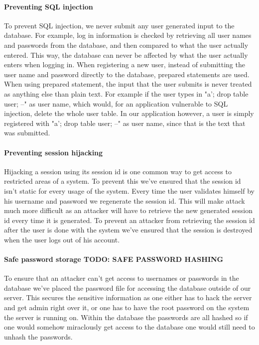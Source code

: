 \documentclass[11pt, a4paper]{article}
\begin{document}
\paragraph{Preventing SQL injection}
To prevent SQL injection, we never submit any user generated input to the database. For example, log in information is checked by retrieving all user names and passwords from the database, and then compared to what the user actually entered. This way, the database can never be affected by what the user actually enters when logging in.
When registering a new user, instead of submitting the user name and password directly to the database, prepared statements are used. When using prepared statement, the input that the user submits is never treated as anything else than plain text. For example if the user types in "a'; drop table user; --" as user name, which would, for an application vulnerable to SQL injection, delete the whole user table. In our application however, a user is simply registered with "a'; drop table user; --" as user name, since that is the text that was submitted.
\paragraph{Preventing session hijacking}
Hijacking a session using its session id is one common way to get access to restricted areas of a system. To prevent this we've ensured that the session id isn't static for every usage of the system. Every time the user validates himself by his username and password we regenerate the session id. This will make attack much more difficult as an attacker will have to retrieve the new generated session id every time it is generated. To prevent an attacker from retrieving the session id after the user is done with the system we've ensured that the session is destroyed when the user logs out of his account. 
\paragraph{Safe password storage TODO: SAFE PASSWORD HASHING}
To ensure that an attacker can't get access to usernames or passwords in the database we've placed the password file for accessing the database outside of our server. This secures the sensitive information as one either has to hack the server and get admin right over it, or one has to have the root password on the system the server is running on. Within the database the passwords are all hashed so if one would somehow miraclously get access to the database one would still need to unhash the passwords. 
\end{document}
